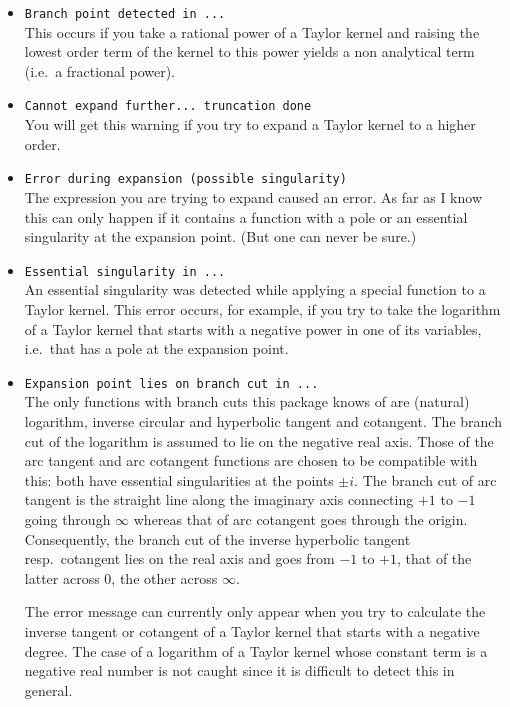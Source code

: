 \begin{itemize}

\item \verb|Branch point detected in ...|\\
    This occurs if you take a rational power of a Taylor kernel
    and raising the lowest order term of the kernel to this
    power yields a non analytical term (i.e.\ a fractional power).

\item \verb|Cannot expand further... truncation done|\\
    You will get this warning if you try to expand a Taylor kernel to
    a higher order.

\item \verb|Error during expansion (possible singularity)|\\
    The expression you are trying to expand caused an error.
    As far as I know this can only happen if it contains a function
    with a pole or an essential singularity at the expansion point.
    (But one can never be sure.)

\item \verb|Essential singularity in ...|\\
    An essential singularity was detected while applying a
    special function to a Taylor kernel.
    This error occurs, for example, if you try to take
    the logarithm of a Taylor kernel that starts with a negative
    power in one of its variables, i.e.\ that has a pole
    at the expansion point.

\item \verb|Expansion point lies on branch cut in ...|\\
    The only functions with branch cuts this package knows of
    are (natural) logarithm, inverse circular and hyperbolic
    tangent and cotangent.
    The branch cut of the logarithm is assumed to lie on the negative
    real axis.  Those of the arc tangent and arc cotangent
    functions are chosen to be compatible with this:
    both have essential singularities at the points $\pm i$.
    The branch cut of arc tangent is the straight line along the
    imaginary axis connecting $+1$ to $-1$ going through $\infty$ whereas
    that of arc cotangent goes through the origin.
    Consequently, the branch cut of the inverse hyperbolic
    tangent resp.\ cotangent lies on the real axis and goes from
    $-1$ to $+1$, that of the latter across
    $0$, the other across $\infty$.
    
    The error message can currently only appear when you try to
    calculate the inverse tangent or cotangent of a Taylor
    kernel that starts with a negative degree.
    The case of a logarithm of a Taylor kernel whose constant term
    is a negative real number is not caught since it is
    difficult to detect this in general.


\end{itemize}
